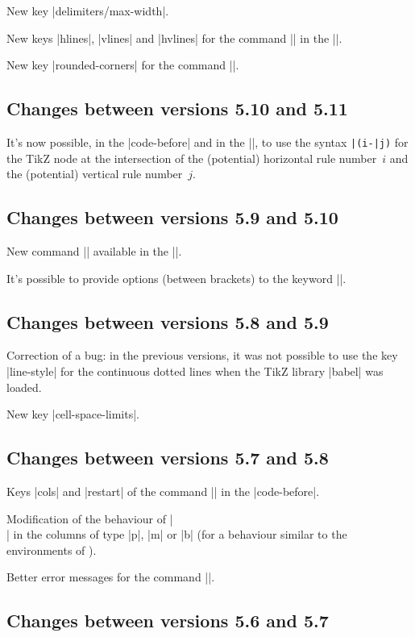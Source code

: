 \documentclass[dvipsnames]{article}%
\begin{document}
New key |delimiters/max-width|.

New keys |hlines|, |vlines| and |hvlines| for the command |\SubMatrix| in the
|\CodeAfter|. 

New key |rounded-corners| for the command |\Block|.

\subsection*{Changes between versions 5.10 and 5.11}

It's now possible, in the |code-before| and in the |\CodeAfter|, to use the
syntax \verb+|(i-|j)+ for the TikZ node at the intersection of the (potential)
horizontal rule number~$i$ and the (potential) vertical rule number~$j$.

\subsection*{Changes between versions 5.9 and 5.10}

New command |\SubMatrix| available in the |\CodeAfter|.

It's possible to provide options (between brackets) to the keyword |\CodeAfter|.

\subsection*{Changes between versions 5.8 and 5.9}

Correction of a bug: in the previous versions, it was not possible to use the
key |line-style| for the continuous dotted lines when the TikZ library |babel|
was loaded.

New key |cell-space-limits|.

\subsection*{Changes between versions 5.7 and 5.8}

Keys |cols| and |restart| of the command |\rowcolors| in the |code-before|.

Modification of the behaviour of |\\| in the columns of type |p|, |m| or |b|
(for a behaviour similar to the environments of ).

Better error messages for the command |\Block|.

\subsection*{Changes between versions 5.6 and 5.7}
\end{document}
